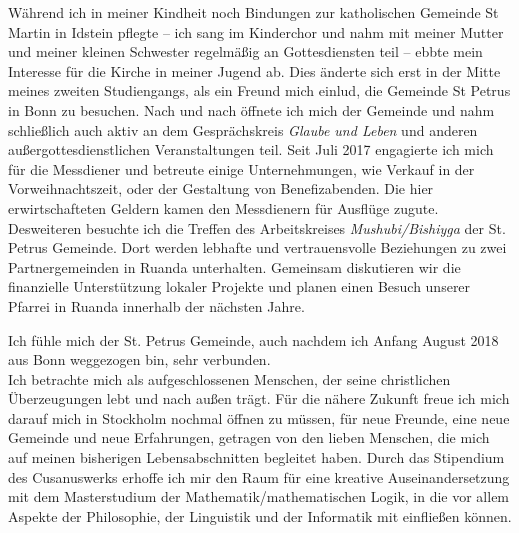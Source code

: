 \documentclass[10pt, a4paper]{article}
\newcommand{\years}[1]{\marginnote{\scriptsize #1}}
\begin{document}
	\years{christlicher Glaube} 
	Während ich in meiner Kindheit noch Bindungen zur katholischen Gemeinde St Martin in Idstein pflegte -- ich sang im Kinderchor und nahm mit meiner Mutter und meiner kleinen Schwester regelmäßig an Gottesdiensten teil -- ebbte mein Interesse für die Kirche in meiner Jugend ab. Dies änderte sich erst in der Mitte meines zweiten Studiengangs, als ein Freund mich einlud, die Gemeinde St Petrus in Bonn zu besuchen. Nach und nach öffnete ich mich der Gemeinde und nahm schließlich auch aktiv an dem Gesprächskreis \emph{Glaube und Leben} und anderen außergottesdienstlichen Veranstaltungen teil. Seit Juli 2017 engagierte ich mich für die Messdiener und betreute einige Unternehmungen, wie Verkauf in der Vorweihnachtszeit, oder der Gestaltung von Benefizabenden. Die hier erwirtschafteten Geldern kamen den Messdienern für Ausflüge zugute.
	Desweiteren besuchte ich die Treffen des Arbeitskreises \emph{Mushubi/Bishiyga} der St. Petrus Gemeinde. Dort werden lebhafte und vertrauensvolle Beziehungen zu zwei Partnergemeinden in Ruanda unterhalten. Gemeinsam diskutieren wir die finanzielle Unterstützung lokaler Projekte und planen einen Besuch unserer Pfarrei in Ruanda innerhalb der nächsten Jahre.
	
	\noindent Ich fühle mich der St. Petrus Gemeinde, auch nachdem ich Anfang August 2018 aus Bonn weggezogen bin, sehr verbunden.  \\


	Ich betrachte mich als aufgeschlossenen Menschen, der seine christlichen Überzeugungen lebt und nach außen trägt. Für die nähere Zukunft freue ich mich darauf mich in Stockholm nochmal öffnen zu müssen, für neue Freunde, eine neue Gemeinde und neue Erfahrungen, getragen von den lieben Menschen, die mich auf meinen bisherigen Lebensabschnitten begleitet haben. Durch das Stipendium des Cusanuswerks erhoffe ich mir den Raum für eine kreative Auseinandersetzung mit dem Masterstudium der Mathematik/mathematischen Logik, in die vor allem Aspekte der Philosophie, der Linguistik und der Informatik mit einfließen können.
\end{document}
